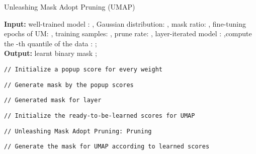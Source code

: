 \documentclass{article}
\theoremstyle{plain}
\theoremstyle{definition}
\theoremstyle{remark}
\begin{document}
\begin{algorithm}[h!]
\caption{Unleashing Mask Adopt Pruning (UMAP)}
  \label{alg:umap}
  {\bf Input:} well-trained model : , Gaussian distribution: , mask ratio: , fine-tuning epochs of UM: , training samples: , prune rate:  , layer-iterated model : ,compute the -th quantile of the data  : ;\\
  {\bf Output:} learnt binary mask ;
\begin{algorithmic}[1]
    \STATE \begin{footnotesize}\texttt{// Initialize a popup score for every weight}\end{footnotesize}\vspace{2mm}
\FOR{}
        \STATE {}
    \ENDFOR\vspace{2mm}
\STATE \begin{footnotesize}\texttt{// Generate mask by the popup scores}\end{footnotesize}\vspace{2mm}
    \FOR{}
        \STATE  \begin{footnotesize}\texttt{// Generated mask for layer }\end{footnotesize}
    \ENDFOR\vspace{2mm}
\STATE \begin{footnotesize}\texttt{// Initialize the ready-to-be-learned scores for UMAP}\end{footnotesize}\vspace{2mm}
    \FOR{}
        \STATE 
    \ENDFOR\vspace{2mm}
    \STATE \begin{footnotesize}\texttt{// Unleashing Mask Adopt Pruning: Pruning}\end{footnotesize}\vspace{2mm}
    \FOR{}
        \STATE \begin{footnotesize}\texttt{// Generate the mask for UMAP according to learned scores }\end{footnotesize}
        \FOR{}
            \STATE  
        \ENDFOR
        \STATE 
    \ENDFOR
    \FOR{}
        \STATE  
    \ENDFOR
\end{algorithmic}
\end{algorithm}
\end{document}
